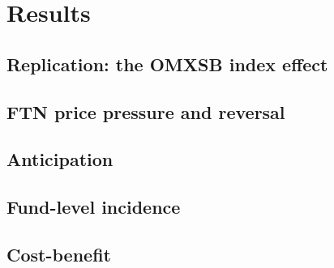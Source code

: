 \section{Results}
\subsection{Replication: the OMXSB index effect}
\subsection{FTN price pressure and reversal}
\subsection{Anticipation}
\subsection{Fund-level incidence}
\subsection{Cost-benefit}
